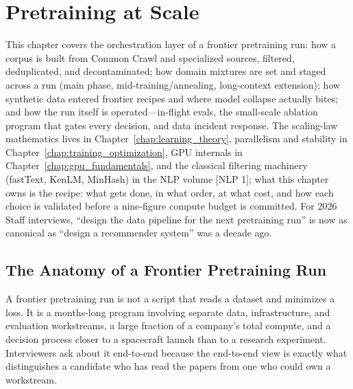 \chapter{Pretraining at Scale}
\label{chap:pretraining_at_scale}

\begin{tldr}
This chapter covers the orchestration layer of a frontier pretraining run: how a corpus is built from Common Crawl and specialized sources, filtered, deduplicated, and decontaminated; how domain mixtures are set and staged across a run (main phase, mid-training/annealing, long-context extension); how synthetic data entered frontier recipes and where model collapse actually bites; and how the run itself is operated---in-flight evals, the small-scale ablation program that gates every decision, and data incident response. The scaling-law mathematics lives in Chapter~\ref{chap:learning_theory}, parallelism and stability in Chapter~\ref{chap:training_optimization}, GPU internals in Chapter~\ref{chap:gpu_fundamentals}, and the classical filtering machinery (fastText, KenLM, MinHash) in the NLP volume [NLP 1]; what this chapter owns is the recipe: what gets done, in what order, at what cost, and how each choice is validated before a nine-figure compute budget is committed. For 2026 Staff interviews, ``design the data pipeline for the next pretraining run'' is now as canonical as ``design a recommender system'' was a decade ago.
\end{tldr}

\section{The Anatomy of a Frontier Pretraining Run}
\label{sec:pretrain_lifecycle}

A frontier pretraining run is not a script that reads a dataset and minimizes a loss. It is a months-long program involving separate data, infrastructure, and evaluation workstreams, a large fraction of a company's total compute, and a decision process closer to a spacecraft launch than to a research experiment. Interviewers ask about it end-to-end because the end-to-end view is exactly what distinguishes a candidate who has read the papers from one who could own a workstream.

